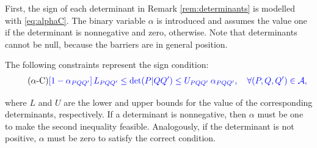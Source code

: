\documentclass[a4paper,  review, authoryear, 1p.]{elsarticle}
\newcommand{\VB}{{V^{}_{\mathcal B}}}
\newcommand{\JP}[1]{{\color{blue}#1}}
\newcommand{\CV}[1]{{\color{blue}#1}}
\newcommand{\determinant}[3]{\det({#1|#2#3})}
\begin{document}
	\newcommand{\LS}[3]{L_{#1#2#3}}
	\newcommand{\US}[3]{U_{#1#2#3}}
	\newcommand{\alphamas}[3]{\alpha_{#1#2#3}}
	\newcommand{\alphamenos}[3]{\alpha^{-}(#1|#2#3)}
	\newcommand{\alphapunto}[3]{\alpha^{\cdotp}(#1|#2#3)}
	
	First, the sign of each determinant in Remark \ref{rem:determinants} \JP{is modelled with \eqref{eq:alphaC}.} The binary variable $\alpha$ is introduced and assumes the value one if the determinant is nonnegative and zero, otherwise. Note that determinants cannot be null, because the barriers are in general position.
	
	The following constraints represent the sign condition:
	\begin{align*}\label{eq:alphaC} \tag{$\alpha$-C}
		\CV{\left[1-\alphamas{P}{Q}{Q'}\right]\LS{P}{Q}{Q'}\leq\determinant{P}{Q}{Q'}\leq \US{P}{Q}{Q'}\:\alphamas{P}{Q}{Q'},\quad\forall (P,Q,Q') \in \mathcal A,}
	\end{align*}
	
	\noindent where $L$ and $U$ are the lower and upper bounds for the value of the corresponding determinants, respectively. If a determinant is nonnegative, then $\alpha$ must be one to make the second inequality feasible. Analogously, if the determinant is not positive, $\alpha$ must be zero to satisfy the correct condition.
	
	\newcommand{\deltamas}[4]{\delta_{#1#2#3#4}}
	
\end{document}
